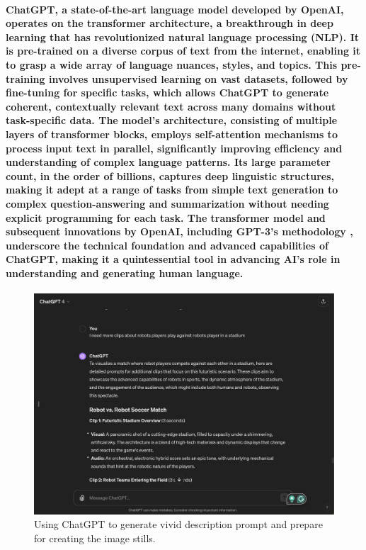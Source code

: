 \documentclass[11pt,a4paper,oneside]{report}
\begin{document}
\paragraph{ChatGPT, a state-of-the-art language model developed by OpenAI, operates on the transformer architecture, a breakthrough in deep learning that has revolutionized natural language processing (NLP). It is pre-trained on a diverse corpus of text from the internet, enabling it to grasp a wide array of language nuances, styles, and topics. This pre-training involves unsupervised learning on vast datasets, followed by fine-tuning for specific tasks, which allows ChatGPT to generate coherent, contextually relevant text across many domains without task-specific data. The model's architecture, consisting of multiple layers of transformer blocks, employs self-attention mechanisms to process input text in parallel, significantly improving efficiency and understanding of complex language patterns. Its large parameter count, in the order of billions, captures deep linguistic structures, making it adept at a range of tasks from simple text generation to complex question-answering and summarization without needing explicit programming for each task. The transformer model \cite{vaswani2017attention} and subsequent innovations by OpenAI, including GPT-3's methodology \cite{brown2020language}, underscore the technical foundation and advanced capabilities of ChatGPT, making it a quintessential tool in advancing AI's role in understanding and generating human language.}

\begin{figure}[htbp]
  \centering
  \includegraphics[width=\textwidth]{ChatGPT.png}
  \caption{Using ChatGPT to generate vivid description prompt and prepare for creating the image stills.}
\end{figure}
\end{document}
